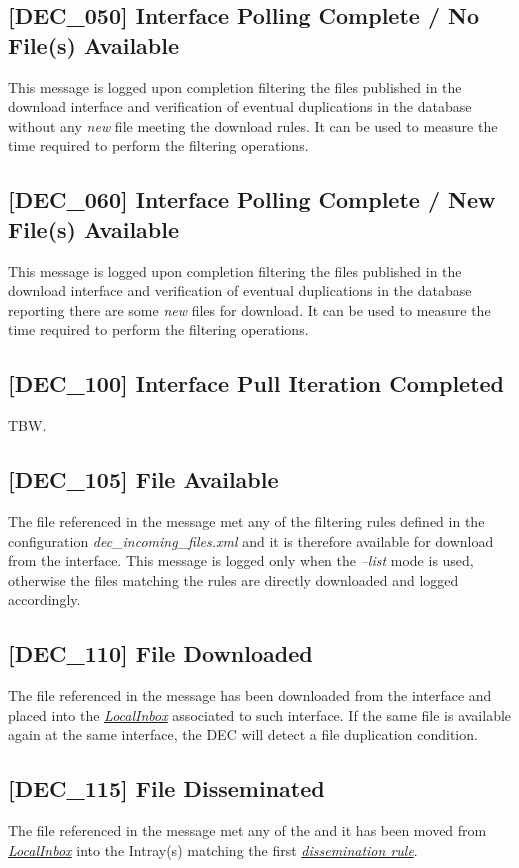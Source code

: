\documentclass[dec_sum_main.tex]{subfiles}
\begin{document}
\label{DEC050}
\subsection{[DEC\_050] Interface Polling Complete / No File(s) Available}
This message is logged upon completion filtering the files published in the download interface and verification of eventual duplications in the database without any \textit{new} file meeting the download rules. It can be used to measure the time required to perform the filtering operations.

\label{DEC060}
\subsection{[DEC\_060] Interface Polling Complete / New File(s) Available}
This message is logged upon completion filtering the files published in the download interface and verification of eventual duplications in the database reporting there are some \textit{new} files for download. It can be used to measure the time required to perform the filtering operations.

\label{DEC100}
\subsection{[DEC\_100] Interface Pull Iteration Completed}
TBW.

\label{DEC105}
\subsection{[DEC\_105] File Available}
The file referenced in the message met any of the filtering rules defined in the configuration \textit{dec\_incoming\_files.xml} and it is therefore available for download from the interface. This message is logged only when the \textit{--list} mode is used, otherwise the files matching the rules are directly downloaded and logged accordingly. 

\label{DEC110}
\subsection{[DEC\_110] File Downloaded}
The file referenced in the message has been downloaded from the interface and placed into the \hyperref[LocalInbox]{\textit{LocalInbox}} associated to such interface. If the same file is available again at the same interface, the DEC will detect a file duplication condition.

\label{DEC115}
\subsection{[DEC\_115] File Disseminated}
The file referenced in the message met any of the and it has been moved from \hyperref[LocalInbox]{\textit{LocalInbox}} into the Intray(s) matching the first \hyperref[Dissemination rules]{\textit{dissemination rule}}.
\end{document}
